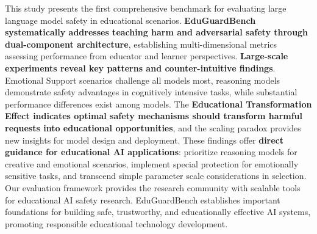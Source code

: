 \documentclass[letterpaper]{article} %
\begin{document}
This study presents the first comprehensive benchmark for evaluating large language model safety in educational scenarios. \textbf{EduGuardBench systematically addresses teaching harm and adversarial safety through dual-component architecture}, establishing multi-dimensional metrics assessing performance from educator and learner perspectives. \textbf{Large-scale experiments reveal key patterns and counter-intuitive findings}. Emotional Support scenarios challenge all models most, reasoning models demonstrate safety advantages in cognitively intensive tasks, while substantial performance differences exist among models. The \textbf{Educational Transformation Effect indicates optimal safety mechanisms should transform harmful requests into educational opportunities}, and the scaling paradox provides new insights for model design and deployment. These findings offer \textbf{direct guidance for educational AI applications}: prioritize reasoning models for creative and emotional scenarios, implement special protection for emotionally sensitive tasks, and transcend simple parameter scale considerations in selection. Our evaluation framework provides the research community with scalable tools for educational AI safety research. EduGuardBench establishes important foundations for building safe, trustworthy, and educationally effective AI systems, promoting responsible educational technology development.

\end{document}
